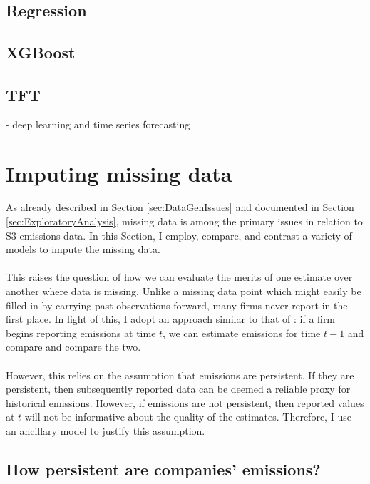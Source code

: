 \documentclass[12pt,twoside]{report}
\begin{document}
\subsection{Regression}

\subsection{XGBoost}

\subsection{TFT}
- deep learning and time series forecasting



\section{Imputing missing data}

As already described in Section \ref{sec:DataGenIssues} and documented in Section \ref{sec:ExploratoryAnalysis}, missing data is among the primary issues in relation to S3 emissions data. In this Section, I employ, compare, and contrast a variety of models to impute the missing data.
\\\\
This raises the question of how we can evaluate the merits of one estimate over another where data is missing. Unlike a missing data point which might easily be filled in by carrying past observations forward, many firms never report in the first place. In light of this, I adopt an approach similar to that of \cite{KalesnikVitali2022}: if a firm begins reporting emissions at time $t$, we can estimate emissions for time $t-1$ and compare and compare the two. 
\\\\
However, this relies on the assumption that emissions are persistent. If they are persistent, then subsequently reported data can be deemed a reliable proxy for historical emissions. However, if emissions are not persistent, then reported values at $t$ will not be informative about the quality of the estimates. Therefore, I use an ancillary model to justify this assumption.

\subsection{How persistent are companies' emissions?}
\end{document}
